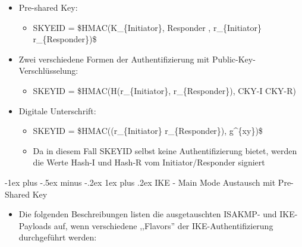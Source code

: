\documentclass[a4paper]{article}
\makeatletter
\renewcommand{\subsubsection}{\@startsection{subsubsection}{3}{0mm}%
 {-1ex plus -.5ex minus -.2ex}%
 {1ex plus .2ex}%
 {\normalfont\small\bfseries}}
\makeatother
\begin{document}
\begin{multicols}{3}
\begin{itemize}
              \begin{itemize}
                  \item
                        Pre-shared Key:

                        \begin{itemize}
                            \item
                                  SKYEID = \$HMAC(K\_\{Initiator\}, Responder , r\_\{Initiator\}
                                  \textbar{} r\_\{Responder\})\$
                        \end{itemize}
                  \item
                        Zwei verschiedene Formen der Authentifizierung mit
                        Public-Key-Verschlüsselung:

                        \begin{itemize}
                            \item
                                  SKEYID = \$HMAC(H(r\_\{Initiator\}, r\_\{Responder\}), CKY-I
                                  \textbar{} CKY-R)
                        \end{itemize}
                  \item
                        Digitale Unterschrift:

                        \begin{itemize}
                            \item
                                  SKEYID = \$HMAC((r\_\{Initiator\} \textbar{} r\_\{Responder\}),
                                  g\^{}\{xy\})\$
                            \item
                                  Da in diesem Fall SKEYID selbst keine Authentifizierung bietet,
                                  werden die Werte Hash-I und Hash-R vom Initiator/Responder
                                  signiert
                        \end{itemize}
              \end{itemize}
    \end{itemize}


    \subsubsection{IKE - Main Mode Austausch mit Pre-Shared
        Key}

    \begin{itemize}
        \item
              Die folgenden Beschreibungen listen die ausgetauschten ISAKMP- und
              IKE-Payloads auf, wenn verschiedene ,,Flavors'' der
              IKE-Authentifizierung durchgeführt werden:


\end{itemize}
\end{multicols}
\end{document}

